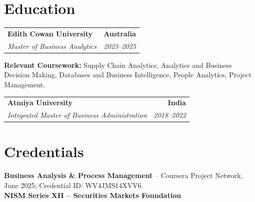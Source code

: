 \documentclass[letterpaper,10pt]{article}
\makeatletter
\newcommand{\role}[4]{%
  \begin{tabularx}{\textwidth}{@{}Xr@{}}
    \textbf{#1} & \textbf{#2} \\
    \textit{#3} & \textit{#4}
  \end{tabularx}\vspace{-1pt}
}
\makeatother
\begin{document}
\section{Education}
\role{Edith Cowan University}{Australia}{Master of Business Analytics}{2023--2025}
\small\textbf{Relevant Coursework:} Supply Chain Analytics, Analytics and Business Decision Making, Databases and Business Intelligence, People Analytics, Project Management.\\[2pt]
\role{Atmiya University}{India}{Integrated Master of Business Administration}{2018--2022}

\section{Credentials}
\small\textbf{Business Analysis \& Process Management} -- Coursera Project Network, June 2025; Credential ID: WV4JMS14XVV6.\\[-0.2pt]
\small\textbf{NISM Series XII -- Securities Markets Foundation}
\end{document}
